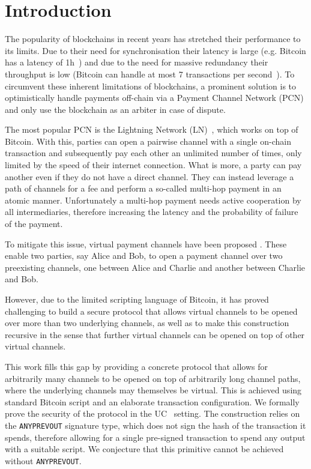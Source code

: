 \section{Introduction}
  The popularity of blockchains in recent years has stretched their
  performance to its limits. Due to their need for synchronisation their latency
  is large (e.g. Bitcoin has a latency of 1h~\cite{bitcoin}) and due to the need
  for massive redundancy their throughput is low (Bitcoin can handle at most 7
  transactions per second~\cite{scaling}). To circumvent these inherent
  limitations of blockchains, a prominent solution is to optimistically handle
  payments off-chain via a Payment Channel Network (PCN)  and only use the blockchain as an arbiter in case of dispute.

  The most popular PCN is the Lightning Network (LN)~\cite{lightning}, which
  works on top of Bitcoin. With this, parties can open a pairwise channel with a
  single on-chain transaction and subsequently pay each other an unlimited
  number of times, only limited by the speed of their internet connection. What
  is more, a party can pay another even if they do not have a direct channel.
  They can instead leverage a path of channels for a fee and perform a so-called
  multi-hop payment in an atomic manner. Unfortunately a multi-hop payment needs
  active cooperation by all intermediaries, therefore increasing the latency and
  the probability of failure of the payment.

  To mitigate this issue, virtual payment channels have been proposed
  . These enable two parties, say Alice and Bob, to open a payment
  channel over two preexisting channels, one between Alice and Charlie and
  another between Charlie and Bob. 

  However, due to the limited scripting language of Bitcoin, it has proved
  challenging to build a secure protocol that allows virtual channels to be
  opened over more than two underlying channels,  as well as to make this
  construction recursive in the sense that further virtual channels can be
  opened on top of other virtual channels.

  This work fills this gap by providing a concrete protocol that allows for
  arbitrarily many channels to be opened on top of arbitrarily long channel
  paths, where the underlying channels may themselves be virtual. This is
  achieved using standard Bitcoin script and an elaborate transaction
  configuration. We formally prove the security of the protocol in the
  UC~\cite{uc} setting. The construction relies on the \texttt{ANYPREVOUT}
  signature type, which does not sign the hash of the transaction it spends,
  therefore allowing for a single pre-signed transaction to spend any output
  with a suitable script. We conjecture that this primitive cannot be achieved
  without \texttt{ANYPREVOUT}.
